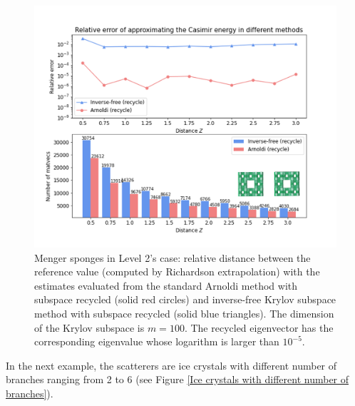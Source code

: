 \begin{figure}[H]
        \centering
        \includegraphics[width = \textwidth]{figures/level2_rel_err.png}
        \caption{Menger sponges in Level 2's case: relative distance between the reference value (computed by Richardson extrapolation) with the estimates evaluated from the standard Arnoldi 
        method with subspace recycled (solid red circles) and inverse-free Krylov subspace method 
        with subspace recycled (solid blue triangles). The dimension of the Krylov subspace is $m = 100$. The recycled eigenvector has the corresponding eigenvalue 
        whose logarithm is larger than $10^{-5}$.}
\end{figure}


In the next example, the scatterers are ice crystals with different number of branches ranging from 2 to 6 (see Figure \ref{Ice crystals with different number of branches}).


